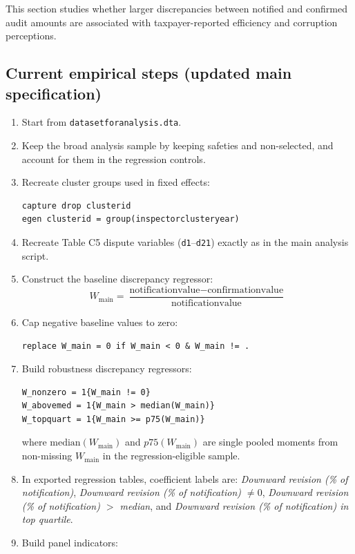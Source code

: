 \documentclass{article}
\begin{document}
\makeatletter
{}
\makeatother

This section studies whether larger discrepancies between notified and confirmed audit amounts are associated with taxpayer-reported efficiency and corruption perceptions.

\subsection{Current empirical steps (updated main specification)}
\begin{enumerate}
\item Start from \texttt{datasetforanalysis.dta}.
\item Keep the broad analysis sample by keeping safeties and non-selected, and account for them in the regression controls.
\item Recreate cluster groups used in fixed effects:
\begin{verbatim}
capture drop clusterid
egen clusterid = group(inspectorclusteryear)
\end{verbatim}
\item Recreate Table C5 dispute variables (\texttt{d1}--\texttt{d21}) exactly as in the main analysis script.
\item Construct the baseline discrepancy regressor:
\[
W_{\text{main}}=\frac{\text{notificationvalue}-\text{confirmationvalue}}{\text{notificationvalue}}
\]
\item Cap negative baseline values to zero:
\begin{verbatim}
replace W_main = 0 if W_main < 0 & W_main != .
\end{verbatim}
\item Build robustness discrepancy regressors:
\begin{verbatim}
W_nonzero = 1{W_main != 0}
W_abovemed = 1{W_main > median(W_main)}
W_topquart = 1{W_main >= p75(W_main)}
\end{verbatim}
where \(\text{median}(W_{\text{main}})\) and \(p75(W_{\text{main}})\) are single pooled moments from non-missing \(W_{\text{main}}\) in the regression-eligible sample.
\item In exported regression tables, coefficient labels are:
\textit{Downward revision (\% of notification)},
\textit{Downward revision (\% of notification) $\neq 0$},
\textit{Downward revision (\% of notification) $>$ median}, and
\textit{Downward revision (\% of notification) in top quartile}.
\item Build panel indicators:

\end{enumerate}
\end{document}
